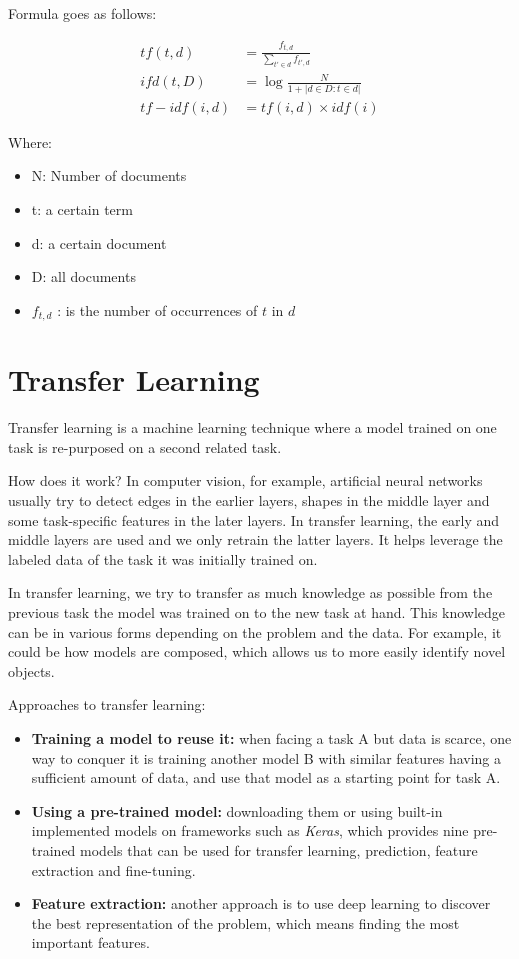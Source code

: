 Formula goes as follows:


\begin{equation}
\begin{split}
tf(t,d) &=  \frac{f_{t,d}}{\sum_{t'\in d}f_{t',d}}\\ 
ifd(t,D) &= \log{\frac{N}{1+|d \in D: t \in d|} }\\
tf-idf(i,d) &= tf(i,d) \times idf(i)
\end{split}
\end{equation}

Where:
\begin{itemize}
    \item N: Number of documents
    \item t: a certain term
    \item d: a certain document
    \item D: all documents
    \item $f_{t,d}$ : is the number of occurrences of $t$ in $d$
\end{itemize}


\section{Transfer Learning}
\label{Transfer Learning}
Transfer learning is a machine learning technique where a model trained on one task is re-purposed on a second related task.

How does it work? In computer vision, for example, artificial neural networks usually try to detect edges in the earlier layers, shapes in the middle layer and some task-specific features in the later layers. In transfer learning, the early and middle layers are used and we only retrain the latter layers. It helps leverage the labeled data of the task it was initially trained on.

In transfer learning, we try to transfer as much knowledge as possible from the previous task the model was trained on to the new task at hand. This knowledge can be in various forms depending on the problem and the data. For example, it could be how models are composed, which allows us to more easily identify novel objects.

Approaches to transfer learning:

\begin{itemize}
    \item \textbf{Training a model to reuse it: }when facing a task A but data is scarce, one way to conquer it is training another model B with similar features having a sufficient amount of data, and use that model as a starting point for task A.
    \item \textbf{Using a pre-trained model: }downloading them or using built-in implemented models on frameworks such as \textit{Keras}, which provides nine pre-trained models that can be used for transfer learning, prediction, feature extraction and fine-tuning. 
    \item \textbf{Feature extraction: }another approach is to use deep learning to discover the best representation of the problem, which means finding the most important features.
\end{itemize}

